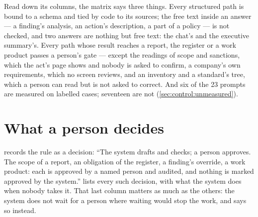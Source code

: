 Read down its columns, the matrix says three things. Every structured path is bound to a
schema and tied by code to its sources; the free text inside an answer --- a finding's
analysis, an action's description, a part of a policy --- is not checked, and two answers are
nothing but free text: the chat's and the executive summary's. Every path whose result reaches a report, the register or
a work product passes a person's gate --- except the readings of scope and sanctions, which the act's page shows and nobody is asked to confirm, a company's own
requirements, which no screen reviews, and an inventory and a standard's tree, which a person
can read but is not asked to correct. And six of the 23 prompts are measured on labelled cases; seventeen are not
(\cref{sec:control:unmeasured}).


\section{What a person decides}\label{sec:control:people}

 records the rule as a decision: \enquote{The system drafts and
checks; a person approves. The scope of a report, an obligation of the register, a finding's
override, a work product: each is approved by a named person and audited, and nothing is
marked approved by the system.}  lists every such decision, with
what the system does when nobody takes it. That last column matters as much as the others:
the system does not wait for a person where waiting would stop the work, and says so instead.

